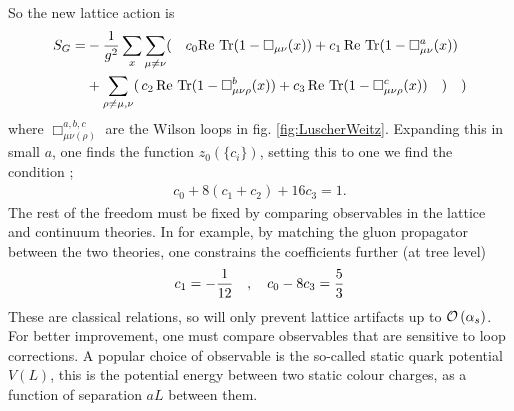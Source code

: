 So the new lattice action is
\begin{align}
  S_G =& - {1\over g^2} \sum_x \sum_{\mu\neq \nu}(\quad c_0 \text{Re Tr} (1-\Box_{\mu\nu}(x)) + c_1 \,\text{Re Tr} (1 - \Box^a_{\mu\nu}(x)) \\
  & + \sum_{\rho\neq \mu,\nu}( \,c_2\, \text{Re Tr} (1 - \Box^b_{\mu\nu\rho}(x)) + c_3 \, \text{Re Tr} (1 - \Box^c_{\mu\nu\rho}(x))\quad)\quad)
\end{align}
where $\Box^{a,b,c}_{\mu\nu(\rho)}$ are the Wilson loops in fig. \ref{fig:LuscherWeitz}. Expanding this in small $a$, one finds the function $z_0(\{c_i\})$, setting this to one we find the condition \cite{WEISZ19831};
\begin{align}
  c_0 + 8 (c_1 + c_2) + 16 c_3 = 1.
\end{align}
The rest of the freedom must be fixed by comparing observables in the lattice and continuum theories. In \cite{WEISZ1984397} for example, by matching the gluon propagator between the two theories, one constrains the coefficients further (at tree level)
\begin{align}
  c_1 = -{1\over 12} \quad,\quad
  c_0 - 8c_3 = {5\over 3}
\end{align}
These are classical relations, so will only prevent lattice artifacts up to $\mathcal{O}\left( \alpha_s \right)$. For better improvement, one must compare observables that are sensitive to loop corrections. A popular choice of observable is the so-called static quark potential $V(L)$, this is the potential energy between two static colour charges, as a function of separation $aL$ between them.

